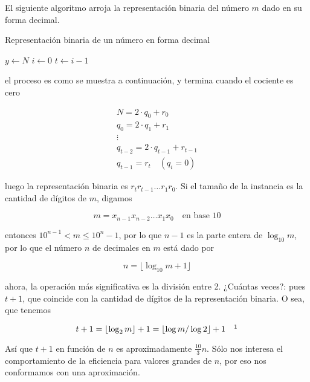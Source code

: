 \begin{ejem}
    El siguiente algoritmo arroja la representación binaria del número $m$ dado en su     forma decimal.
    
    \begin{algoritmo}
    \caption{Representación binaria de un número en forma decimal}\label{alg:bin}
    $y \leftarrow N$\;
    $i \leftarrow 0$\;
    $t \leftarrow i-1$\;
    \end{algoritmo}
    
    \noindent el proceso es como se muestra a continuación, y termina cuando el cociente es cero
    
    \begin{gather*}
        N = 2 \cdot q_0 + r_0 \\
        q_0 = 2 \cdot q_1 + r_1 \\
        \vdots \\
        q_{t-2} = 2 \cdot q_{t-1} + r_{t-1} \\
        q_{t-1} = r_t \quad (q_i = 0)
    \end{gather*}
    
    \noindent luego la representación binaria es $r_tr_{t-1} \dots r_1r_0$. Si el tamaño de la instancia es la cantidad de dígitos de $m$, digamos
    
    \[
    m = x_{n-1}x_{n-2}\dots x_1x_0 \quad \text{en base 10}
    \]
    
    \noindent entonces $10^{n-1} < m \leq 10^n-1$, por lo que $n-1$ es la parte entera de $\log_{10}m$, por lo que el número $n$ de decimales en $m$ está dado por
    
    \[
    n = \lfloor \log_{10}m + 1 \rfloor
    \]
    
    \noindent ahora, la operación más significativa es la división entre 2. ¿Cuántas veces?: pues $t+1$, que coincide con la cantidad de dígitos de la representación binaria. O sea, que tenemos
    
    \[
    t + 1 = \lfloor \log_2m \rfloor + 1 = \lfloor \log m / \log 2 \rfloor + 1 \quad \footnotemark
    \]
    
    Así que $t+1$ en función de $n$ es aproximadamente $\frac{10}{3}n$. Sólo nos interesa el comportamiento de la eficiencia para valores grandes de $n$, por eso nos conformamos con una aproximación.
\end{ejem}

